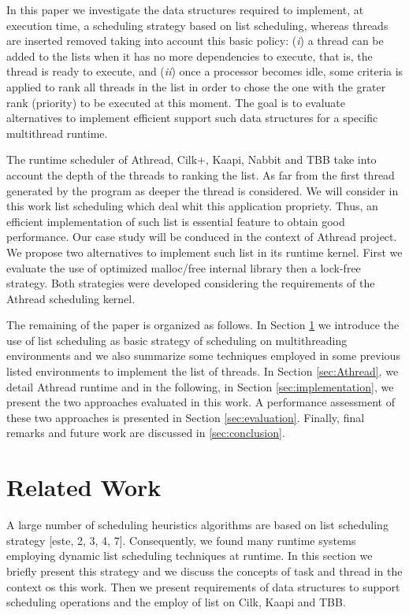\documentclass{sig-alternate}
\begin{document}
In this paper we investigate the data structures required to
implement, at execution time, a scheduling strategy based on list
scheduling, whereas threads are inserted removed taking into account
this basic policy: ({\em i}) a thread can be added to the lists when
it has no more dependencies to execute, that is, the thread is ready
to execute, and ({\em ii}) once a processor becomes idle, some
criteria is applied to rank all threads in the list in order to chose
the  one with the grater rank (priority) to be executed at this
moment. The goal is to evaluate alternatives to implement efficient
support such data structures for a specific multithread runtime.

The runtime scheduler of Athread, Cilk+, Kaapi, Nabbit and TBB take
into account the depth of the threads to ranking the list. As far from
the first thread generated by the program as deeper the thread is
considered. We will consider in this work list scheduling which deal
whit this application propriety. Thus, an efficient implementation of
such list is essential feature to obtain good performance. Our case
study will be conduced in the context of Athread project. We propose
two alternatives to implement such list in its runtime kernel. First
we evaluate the use of optimized malloc/free internal library then a
lock-free strategy. Both strategies were developed considering the
requirements of the Athread scheduling kernel.

The remaining of the paper is organized as follows. In Section
\ref{sec:related}  we introduce the use of list scheduling as basic
strategy of scheduling on multithreading environments and we also
summarize some techniques employed in some previous listed
environments to implement the list of threads.  In Section
\ref{sec:Athread}, we detail Athread runtime and in the following, in
Section \ref{sec:implementation}, we present the two approaches
evaluated in this work. A performance assessment of these two
approaches is presented in Section \ref{sec:evaluation}. Finally,
final remarks and future work are discussed in \ref{sec:conclusion}.

\section{Related Work}\label{sec:related}

A large number of scheduling heuristics algorithms are based on list
scheduling strategy [este, 2, 3, 4, 7]. Consequently, we found many
runtime systems employing dynamic list scheduling techniques at
runtime. In this section we briefly present this strategy and we
discuss the concepts of task and thread in the context os this work.
Then we present requirements of data structures to support scheduling
operations and the employ of list on Cilk, Kaapi and TBB.
\end{document}
